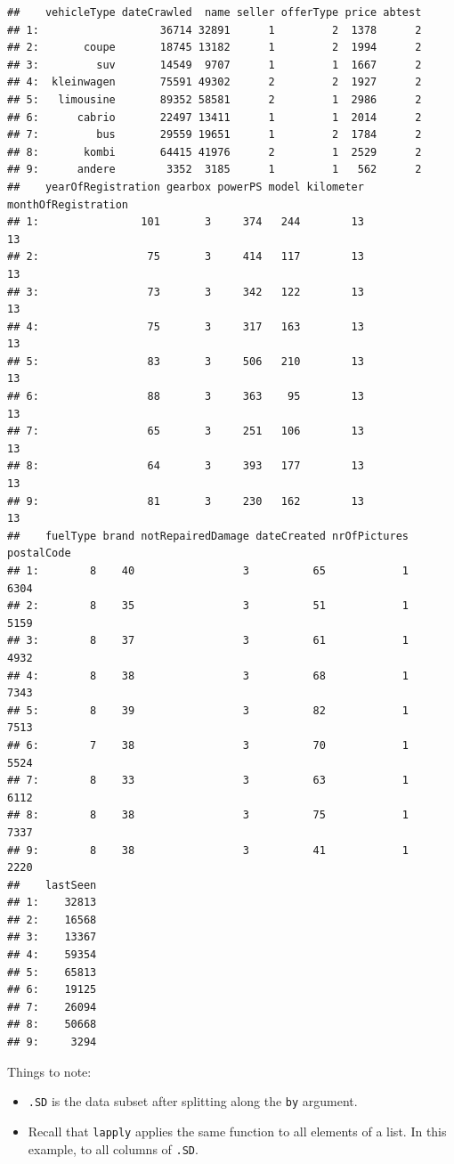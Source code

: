 \documentclass[]{book}
\providecommand{\tightlist}{%
  \setlength{\itemsep}{0pt}\setlength{\parskip}{0pt}}
\theoremstyle{definition}
\theoremstyle{definition}
\theoremstyle{definition}
\theoremstyle{remark}
\begin{document}
\begin{verbatim}
##    vehicleType dateCrawled  name seller offerType price abtest
## 1:                   36714 32891      1         2  1378      2
## 2:       coupe       18745 13182      1         2  1994      2
## 3:         suv       14549  9707      1         1  1667      2
## 4:  kleinwagen       75591 49302      2         2  1927      2
## 5:   limousine       89352 58581      2         1  2986      2
## 6:      cabrio       22497 13411      1         1  2014      2
## 7:         bus       29559 19651      1         2  1784      2
## 8:       kombi       64415 41976      2         1  2529      2
## 9:      andere        3352  3185      1         1   562      2
##    yearOfRegistration gearbox powerPS model kilometer monthOfRegistration
## 1:                101       3     374   244        13                  13
## 2:                 75       3     414   117        13                  13
## 3:                 73       3     342   122        13                  13
## 4:                 75       3     317   163        13                  13
## 5:                 83       3     506   210        13                  13
## 6:                 88       3     363    95        13                  13
## 7:                 65       3     251   106        13                  13
## 8:                 64       3     393   177        13                  13
## 9:                 81       3     230   162        13                  13
##    fuelType brand notRepairedDamage dateCreated nrOfPictures postalCode
## 1:        8    40                 3          65            1       6304
## 2:        8    35                 3          51            1       5159
## 3:        8    37                 3          61            1       4932
## 4:        8    38                 3          68            1       7343
## 5:        8    39                 3          82            1       7513
## 6:        7    38                 3          70            1       5524
## 7:        8    33                 3          63            1       6112
## 8:        8    38                 3          75            1       7337
## 9:        8    38                 3          41            1       2220
##    lastSeen
## 1:    32813
## 2:    16568
## 3:    13367
## 4:    59354
## 5:    65813
## 6:    19125
## 7:    26094
## 8:    50668
## 9:     3294
\end{verbatim}

Things to note:

\begin{itemize}
\tightlist
\item
  \texttt{.SD} is the data subset after splitting along the \texttt{by}
  argument.
\item
  Recall that \texttt{lapply} applies the same function to all elements
  of a list. In this example, to all columns of \texttt{.SD}.
\end{itemize}
\end{document}

